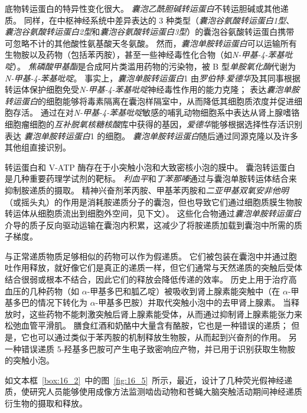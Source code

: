 底物转运蛋白的特异性变化很大。
\textit{囊泡乙酰胆碱转运蛋白}不转运胆碱或其他递质。
同样，在中枢神经系统中差异表达的 3 种类型（\textit{囊泡谷氨酸转运蛋白1型}、\textit{囊泡谷氨酸转运蛋白2型}和\textit{囊泡谷氨酸转运蛋白3型}）的囊泡谷氨酸转运蛋白携带可忽略不计的其他酸性氨基酸天冬氨酸。
然而，\textit{囊泡单胺转运蛋白}可以运输所有生物胺以及药物（包括苯丙胺），甚至一些神经毒性化合物（如\textit{N-甲基-4-苯基吡啶}）。
\textit{焦磷酸甲基酯}是合成阿片类滥用药物的污染物，被 B 型\textit{单胺氧化酶}代谢为\textit{N-甲基-4-苯基吡啶}。
事实上，\textit{囊泡单胺转运蛋白}1 由\textit{罗伯特$\cdot$爱德华}及其同事根据转运体保护细胞免受\textit{N-甲基-4-苯基吡啶}神经毒性作用的能力克隆；
表达\textit{囊泡单胺转运蛋白}的细胞能够将毒素隔离在囊泡样隔室中，从而降低其细胞质浓度并促进细胞存活。
通过在对\textit{N-甲基-4-苯基吡啶}敏感的哺乳动物细胞系中表达从肾上腺嗜铬细胞瘤细胞的\textit{互补脱氧核糖核酸}库中获得的基因，\textit{爱德华}能够根据选择性存活识别表达 \textit{囊泡单胺转运蛋白}1 的细胞。
\textit{囊泡单胺转运蛋白}随后通过同源克隆以及许多其他组直接识别。


转运蛋白和 V-ATP 酶存在于小突触小泡和大致密核小泡的膜中。
囊泡转运蛋白是几种重要药理学试剂的靶标。
\textit{利血平}和\textit{丁苯那嗪}通过与囊泡单胺转运体结合来抑制胺递质的摄取。
精神兴奋剂苯丙胺、甲基苯丙胺和\textit{二亚甲基双氧安非他明}（或摇头丸）的作用是消耗胺递质分子的囊泡，但也导致它们通过细胞质膜生物胺转运体从细胞质流出到细胞外空间，见下文）。
这些化合物通过\textit{囊泡单胺转运蛋白} 介导的质子反向驱动运输在囊泡内积累，这减少了将胺递质加载到囊泡中所需的质子梯度。


与正常递质物质足够相似的药物可以作为假递质。
它们被包装在囊泡中并通过胞吐作用释放，就好像它们是真正的递质一样，但它们通常与天然递质的突触后受体结合很弱或根本不结合，因此它们的释放会降低传递的效率。
历史上用于治疗高血压的几种药物（如 $\alpha$-甲基多巴和胍乙啶）被吸收到肾上腺素能突触中（在 $\alpha$-甲基多巴的情况下转化为 $\alpha$-甲基多巴胺）并取代突触小泡中的去甲肾上腺素。
当释放时，这些药物不能刺激突触后肾上腺素能受体，从而通过抑制肾上腺素能张力来松弛血管平滑肌。
膳食红酒和奶酪中大量含有酪胺，它也是一种错误的递质；
但是，它也可以通过类似于苯丙胺的机制释放生物胺，从而起到兴奋剂的作用。
另一种错误递质 5-羟基多巴胺可产生电子致密响应产物，并已用于识别获取生物胺的突触小泡。


如文本框~\ref{box:16_2}~中的图~\ref{fig:16_5}~所示，最近，设计了几种荧光假神经递质，使研究人员能够使用成像方法监测啮齿动物和苍蝇大脑突触活动期间神经递质衍生物的摄取和释放。


